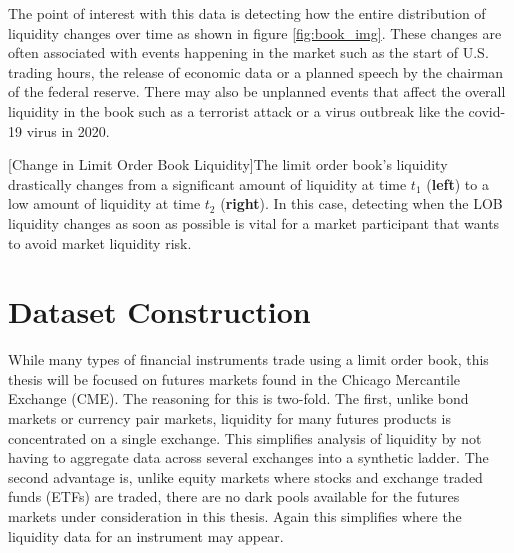 The point of interest with this data is detecting how the entire distribution of liquidity changes over time as shown in figure \ref{fig:book_img}. These changes are often associated with events happening in the market such as the start of U.S. trading hours, the release of economic data or a planned speech by the chairman of the federal reserve. There may also be unplanned events that affect the overall liquidity in the book such as a terrorist attack or a virus outbreak like the covid-19 virus in 2020.

\begin{center} 
[Change in Limit Order Book Liquidity]{The limit order book's liquidity drastically changes from a significant amount of liquidity at time $t_1$  (\textbf{left}) to a low amount of liquidity at time $t_2$ (\textbf{right}). In this case, detecting when the LOB liquidity changes as soon as possible is vital for a market participant that wants to avoid market liquidity risk.} 
\label{fig:book_img} 
\end{center}



\section{Dataset Construction}
\label{liq_data_construction}
While many types of financial instruments trade using a limit order book, this thesis will be focused on futures markets found in the Chicago Mercantile Exchange (CME). The reasoning for this is two-fold. The first, unlike bond markets or currency pair markets, liquidity for many futures products is concentrated on a single exchange. This simplifies analysis of liquidity by not having to aggregate data across several exchanges into a synthetic ladder. The second advantage is, unlike equity markets where stocks and exchange traded funds (ETFs) are traded, there are no dark pools available for the futures markets under consideration in this thesis. Again this simplifies where the liquidity data for an instrument may appear.

